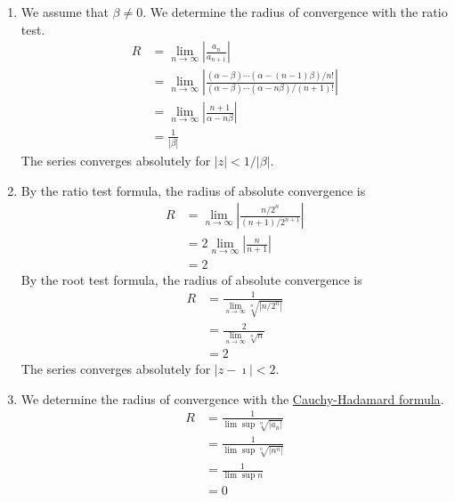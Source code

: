 {%
\begin{Solution}
  \label{solution convergence n/2^n (z-i)^n}
  \begin{enumerate}
  \item
    We assume that $\beta \neq 0$.  We determine the radius of convergence 
    with the ratio test.
    \begin{align*}
      R 
      &= \lim_{n \to \infty} \left| \frac{ a_n }{ a_{n+1} } \right| 
      \\
      &= \lim_{n \to \infty} \left| \frac{ (\alpha - \beta) \cdots (\alpha - (n - 1) \beta) / n! }
        { (\alpha - \beta) \cdots (\alpha - n \beta) / (n + 1)! } \right| 
      \\
      &= \lim_{n \to \infty} \left| \frac{ n + 1 }{ \alpha - n \beta } \right| 
      \\
      &= \frac{1}{|\beta|}
    \end{align*}
    The series converges absolutely for $|z| < 1 / |\beta|$.
  \item
    By the ratio test formula, the radius of absolute convergence is
    \begin{align*}
      R
      &= \lim_{n \to \infty} \left| \frac{n / 2^n}{(n + 1) / 2^{n+1}} \right| 
      \\
      &= 2 \lim_{n \to \infty} \left| \frac{n}{n + 1} \right| 
      \\
      &= 2
    \end{align*}
    By the root test formula, the radius of absolute convergence is
    \begin{align*}
      R
      &= \frac{ 1 }{ \lim_{n \to \infty} \sqrt[n]{| n / 2^n |} } 
      \\
      &= \frac{ 2 }{ \lim_{n \to \infty} \sqrt[n]{ n } } 
      \\
      &= 2
    \end{align*}
    The series converges absolutely for $|z - \imath| < 2$.
  \item
    We determine the radius of convergence with the 
    \hyperref[result cauchy hadamard formula]{Cauchy-Hadamard formula}.
    \begin{align*}
      R 
      &= \frac{ 1 }{ \lim \sup \sqrt[n]{|a_n|} } 
      \\
      &= \frac{ 1 }{ \lim \sup \sqrt[n]{|n^n|} } 
      \\
      &= \frac{ 1 }{ \lim \sup n } 
      \\
      &= 0
    \end{align*}

\end{enumerate}
\end{Solution}}
